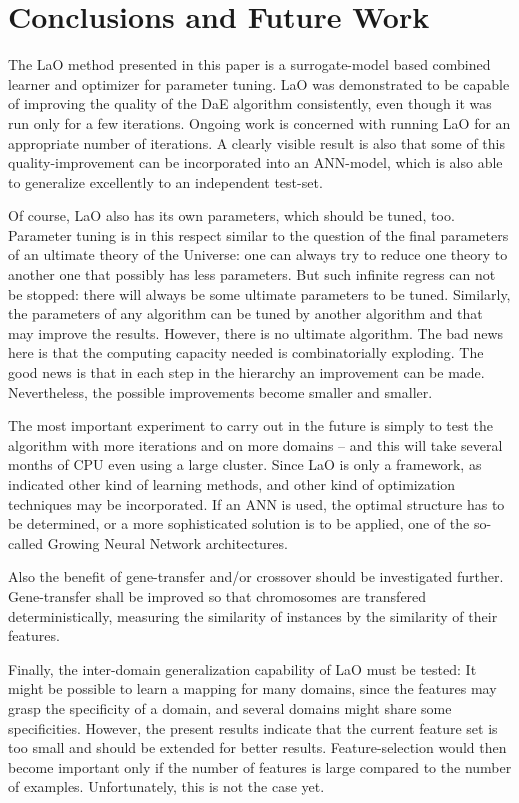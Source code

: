 \documentclass{MYsig-alternate}
\begin{document}
\section{Conclusions and Future Work}
\label{section:conclusions}
\label{section:futurework}	

The LaO method presented in this paper is a surrogate-model based combined learner and optimizer for parameter tuning. LaO was demonstrated to be capable of improving the quality of the DaE algorithm consistently, even though it was run only for a few iterations. Ongoing work is concerned with running LaO for an appropriate number of iterations. A clearly visible result is also that some of this quality-improvement can be incorporated into an ANN-model, which is also able to generalize excellently to an independent test-set.


Of course, LaO also has its own parameters, which should be tuned, too. Parameter tuning is in this respect similar to the question of the final parameters of an ultimate theory of the Universe: one can always try to reduce one theory to another one that possibly has less parameters. But such infinite regress can not be stopped: there will always be some ultimate parameters to be tuned. Similarly, the parameters of any algorithm can be tuned by another algorithm and that may improve the results. However, there is no ultimate algorithm. The bad news here is that the computing capacity needed is combinatorially exploding. The good news is that in each step in the hierarchy an improvement can be made. Nevertheless, the possible improvements become smaller and smaller.


The most important experiment to carry out in the future is simply to test the algorithm with more iterations and on more domains -- and this will take several months of CPU even using a large cluster. Since LaO is only a framework, as indicated other kind of learning methods, and other kind of optimization techniques may be incorporated. If an ANN is used, the optimal structure has to be determined, or a more sophisticated solution is to be applied, one of the so-called Growing Neural Network architectures.

Also the benefit of gene-transfer and/or crossover should be investigated further. Gene-transfer shall be improved so that chromosomes are transfered deterministically, measuring the similarity of instances by the similarity of their features.

Finally, the inter-domain generalization capability of LaO must be tested: It might be possible to learn a mapping for many domains, since the features may grasp the specificity of a domain, and several domains might share some specificities. However, the present results indicate that the current feature set is too small and should be extended for better results. Feature-selection would then become important only if the number of features is large compared to the number of examples. Unfortunately, this is not the case yet.\\
\end{document}
